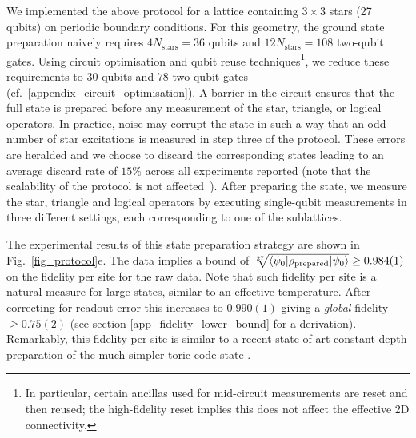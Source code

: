 \documentclass[nofootinbib,pra,twocolumn,showpacs,superscriptaddress,notitlepage,amsmath]{revtex4-2} %
\begin{document}
We implemented the above protocol for a lattice containing $3 \times 3$ stars (27 qubits) on periodic boundary conditions. For this geometry, the ground state preparation naively requires $4 N_\text{stars} = 36$ qubits and $12 N_\text{stars} = 108$ two-qubit gates. Using circuit optimisation and qubit reuse techniques\footnote{In particular, certain ancillas used for mid-circuit measurements are reset and then reused; the high-fidelity reset implies this does not affect the effective 2D connectivity.}, we reduce these requirements to $30$ qubits and $78$ two-qubit gates (cf.~\ref{appendix_circuit_optimisation}). A barrier in the circuit ensures that the full state is prepared before any measurement of the star, triangle, or logical operators. In practice, noise may corrupt the state in such a way that an odd number of star excitations is measured in step three of the protocol. These errors are heralded and we choose to discard the corresponding states leading to an average discard rate of $15\%$ across all experiments reported (note that the scalability of the protocol is not affected~\cite{iqbal_topological_2023}). After preparing the state, we measure the star, triangle and logical operators by executing single-qubit measurements in three different settings, each corresponding to one of the sublattices.

The experimental results of this state preparation strategy are shown in Fig.~\ref{fig_protocol}e. The data implies a bound of $\sqrt[27]{\braket{\psi_0|\rho_\text{prepared}|\psi_0} }\geq  0.984(1)$ on the fidelity per site for the raw data. Note that such fidelity per site is a natural measure for large states, similar to an effective temperature. After correcting for readout error this increases to $0.990(1)$ giving a {\it global} fidelity $\geq 0.75(2)$ (see section \ref{app_fidelity_lower_bound} for a derivation). Remarkably, this fidelity per site is similar to a recent state-of-art constant-depth preparation of the much simpler toric code state \cite{iqbal_topological_2023}.
\end{document}
